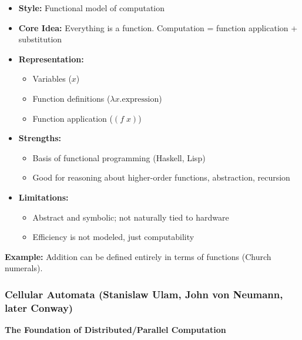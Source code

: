 \begin{itemize}
\item \textbf{Style:} Functional model of computation
\item \textbf{Core Idea:} Everything is a function. Computation = function application + substitution
\item \textbf{Representation:}
\begin{itemize}
\item Variables ($x$)
\item Function definitions ($\lambda x. \text{expression}$)
\item Function application ($(f \; x)$)
\end{itemize}
\item \textbf{Strengths:}
\begin{itemize}
\item Basis of functional programming (Haskell, Lisp)
\item Good for reasoning about higher-order functions, abstraction, recursion
\end{itemize}
\item \textbf{Limitations:}
\begin{itemize}
\item Abstract and symbolic; not naturally tied to hardware
\item Efficiency is not modeled, just computability
\end{itemize}
\end{itemize}

\textbf{Example:} Addition can be defined entirely in terms of functions (Church numerals).

\subsubsection{Cellular Automata (Stanislaw Ulam, John von Neumann, later Conway)}

\textbf{The Foundation of Distributed/Parallel Computation}

